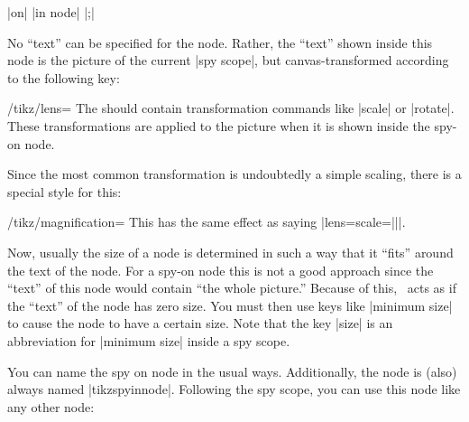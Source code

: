 \begin{command}{\spy {} |on| 
    |in node| |;|}
\begin{enumerate}
\begin{codeexample}[]
\end{codeexample}
    No ``text'' can be specified for the node. Rather, the ``text''
    shown inside this node is the picture of the current |spy scope|,
    but canvas-transformed according to the following key:
    \begin{key}{/tikz/lens=}
      The  should contain transformation commands like
      |scale| or |rotate|. These transformations are applied to the
      picture when it is shown inside the spy-on node.
    \end{key}
    Since the most common transformation is undoubtedly a simple
    scaling, there is a special style for this:
    \begin{key}{/tikz/magnification=}
      This has the same effect as saying
      |lens={scale=||}|.
    \end{key}
    Now, usually the size of a node is determined in such a way that
    it ``fits'' around the text of the node. For a spy-on node this is
    not a good approach since the ``text'' of this node would contain
    ``the whole picture.'' Because of this, \tikzname\ acts
    as if the ``text'' of the node has zero size. You must then use
    keys like |minimum size| to cause the node to have a certain
    size. Note that the key |size| is an abbreviation for
    |minimum size| inside a spy scope.

    You can name the spy on node in the usual ways. Additionally, the
    node is (also) always named |tikzspyinnode|. Following the spy
    scope, you can use this node like any other node:
\begin{codeexample}[]
\end{codeexample}


\end{enumerate}
\end{command}
